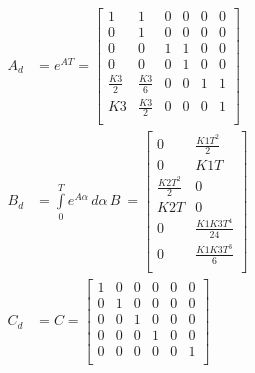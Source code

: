 \begin{subequations}\label{eq:discrete_matrices}
    \begin{align}
    A_d &= e^{AT} = \begin{bmatrix}
    1 & 1 & 0 & 0 & 0 & 0\\
    0 & 1 & 0 & 0 & 0 & 0\\
    0 & 0 & 1 & 1 & 0 & 0\\
    0 & 0 & 0 & 1 & 0 & 0\\
    \frac{K3}{2} & \frac{K3}{6} & 0 & 0 & 1 & 1\\
    K3 & \frac{K3}{2} & 0 & 0 & 0 & 1\\
    \end{bmatrix} \label{eq:discrete_Ad}\\
    B_d &= \int\limits_0^T e^{A\alpha} \, d\alpha \, B \ = \begin{bmatrix}
    0 & \frac{K1T^2}{2} \\
    0 & K1T \\
    \frac{K2T^2}{2} & 0 \\
    K2T & 0 \\
    0 & \frac{K1K3T^4}{24} \\
    0 & \frac{K1K3T^3}{6} \\
    \end{bmatrix} \label{eq:discrete_Bd}\\
    C_d &= C = \begin{bmatrix}
        1 & 0 & 0 & 0 & 0 & 0\\
        0 & 1 & 0 & 0 & 0 & 0\\
        0 & 0 & 1 & 0 & 0 & 0\\
        0 & 0 & 0 & 1 & 0 & 0\\
        0 & 0 & 0 & 0 & 0 & 1\\
    \end{bmatrix}\label{eq:discrete_Cd}
    \end{align}
\end{subequations}


